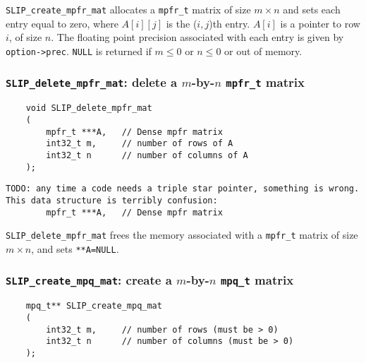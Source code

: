 \documentclass[12pt]{article}
\theoremstyle{definition}
\begin{document}
\verb|SLIP_create_mpfr_mat| allocates a \verb|mpfr_t| matrix of size $m \times
n$ and sets each entry equal to zero, where $A[i][j]$ is the ($i,j$)th entry.
$A[i]$ is a pointer to row $i$, of size $n$. The floating point precision
associated with each entry is given by \verb|option->prec|. \verb|NULL| is returned if
$m \le 0 $ or $n\le 0$ or out of memory.


\cprotect\subsubsection{\verb|SLIP_delete_mpfr_mat|: delete a $m$-by-$n$ \verb|mpfr_t| matrix}

\begin{mdframed}[userdefinedwidth=6in]
{\footnotesize
\begin{verbatim}
    void SLIP_delete_mpfr_mat
    (
        mpfr_t ***A,   // Dense mpfr matrix
        int32_t m,     // number of rows of A
        int32_t n      // number of columns of A
    );
\end{verbatim}
} \end{mdframed}

\begin{verbatim}
TODO: any time a code needs a triple star pointer, something is wrong.
This data structure is terribly confusion:
        mpfr_t ***A,   // Dense mpfr matrix
\end{verbatim}

\verb|SLIP_delete_mpfr_mat| frees the memory associated with a \verb|mpfr_t|
matrix of size $m \times n$, and sets \verb|**A=NULL|.

\cprotect\subsubsection{\verb|SLIP_create_mpq_mat|: create a $m$-by-$n$ \verb|mpq_t| matrix}
\label{ss:create_mpq_mat}

\begin{mdframed}[userdefinedwidth=6in]
{\footnotesize
\begin{verbatim}
    mpq_t** SLIP_create_mpq_mat
    (
        int32_t m,     // number of rows (must be > 0)
        int32_t n      // number of columns (must be > 0)
    );
\end{verbatim}
} \end{mdframed}
\end{document}
